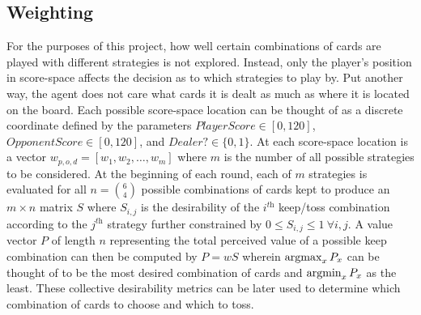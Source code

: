 

\subsection{Weighting}
\label{sec:dm-methods-weighting}



For the purposes of this project,
how well certain combinations of cards are played with different strategies
is not explored.
%
Instead, only the player's position in score-space affects the decision as to
which strategies to play by.
%
Put another way, the agent does not care what cards it is dealt as much as where
it is located on the board.
%
Each possible score-space location can be thought of as a discrete coordinate
defined by the parameters
$\textit{PlayerScore} \in [0, 120]$,
$\textit{OpponentScore} \in [0, 120]$,
and
$\textit{Dealer?} \in \{0,1\}$.
%
At each score-space location is a vector $w_{p,o,d} = [w_1,w_2,\ldots,w_m]$
where $m$ is the number of all possible strategies to be considered.
At the beginning of each round, each of $m$ strategies is evaluated for all
$n = {6 \choose 4}$ possible combinations of cards kept to produce an
$m \times n$ matrix $S$
where $S_{i,j}$ is the desirability of the $i^{\textit{th}}$ keep/toss
combination according to the $j^{\textit{th}}$ strategy
further constrained by
$0 \le S_{i,j} \le 1\ \forall i,j$.
%
A value vector $P$ of length $n$ representing the total perceived value of a
possible keep combination
can then be computed by
$P = w S$
wherein $\operatorname*{argmax}_{x}{P_x}$ can be thought of to be the most desired combination
of cards and $\operatorname*{argmin}_{x}{P_x}$ as the least.
%
These collective desirability metrics can be later used to determine which
combination of cards to choose and which to toss.




